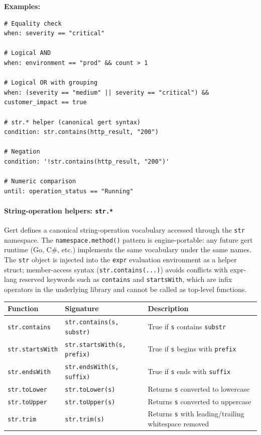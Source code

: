\textbf{Examples:}
\begin{verbatim}
# Equality check
when: severity == "critical"

# Logical AND
when: environment == "prod" && count > 1

# Logical OR with grouping
when: (severity == "medium" || severity == "critical") && customer_impact == true

# str.* helper (canonical gert syntax)
condition: str.contains(http_result, "200")

# Negation
condition: '!str.contains(http_result, "200")'

# Numeric comparison
until: operation_status == "Running"
\end{verbatim}

\paragraph{String-operation helpers: \texttt{str.*}}
\label{para:str-helpers}

Gert defines a canonical string-operation vocabulary accessed through the
\texttt{str} namespace.  The \texttt{namespace.method()} pattern is
engine-portable: any future gert runtime (Go, C\#, etc.) implements the same
vocabulary under the same names.  The \texttt{str} object is injected into the
\texttt{expr} evaluation environment as a helper struct; member-access syntax
(\texttt{str.contains(...)}) avoids conflicts with expr-lang reserved keywords
such as \texttt{contains} and \texttt{startsWith}, which are infix operators in
the underlying library and cannot be called as top-level functions.

\begin{center}
\begin{tabular}{lp{4.5cm}p{4.5cm}}
\hline
\textbf{Function} & \textbf{Signature} & \textbf{Description} \\
\hline
\texttt{str.contains}    & \texttt{str.contains(s, substr)}  & True if \texttt{s} contains \texttt{substr} \\
\texttt{str.startsWith}  & \texttt{str.startsWith(s, prefix)} & True if \texttt{s} begins with \texttt{prefix} \\
\texttt{str.endsWith}    & \texttt{str.endsWith(s, suffix)}   & True if \texttt{s} ends with \texttt{suffix} \\
\texttt{str.toLower}     & \texttt{str.toLower(s)}            & Returns \texttt{s} converted to lowercase \\
\texttt{str.toUpper}     & \texttt{str.toUpper(s)}            & Returns \texttt{s} converted to uppercase \\
\texttt{str.trim}        & \texttt{str.trim(s)}               & Returns \texttt{s} with leading/trailing whitespace removed \\
\hline
\end{tabular}
\end{center}

